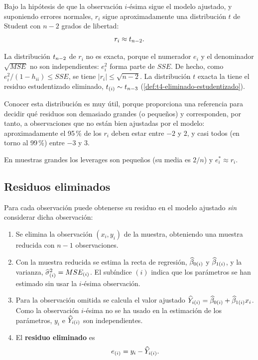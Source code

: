 Bajo la hipótesis de que la observación $i$-ésima sigue el modelo ajustado, y suponiendo errores
normales, $r_i$ sigue aproximadamente una distribución $t$ de Student con $n-2$ grados de
libertad:
\[
  r_i \approx t_{n-2}.
\]

\begin{nota}
  La distribución $t_{n-2}$ de $r_i$ no es exacta, porque el numerador $e_i$ y el
  denominador $\sqrt{MSE}$ no son independientes: $e_i^2$ forma parte de $SSE$. De hecho, como
  $e_i^2/(1-h_{ii})\le SSE$, se tiene $|r_i|\le\sqrt{n-2}$. La distribución $t$ exacta la tiene el
  residuo estudentizado eliminado, $t_{(i)}\sim t_{n-3}$ (\cref{def:t4-eliminado-estudentizado}).
\end{nota}

Conocer esta distribución es muy útil, porque proporciona una referencia para decidir qué
residuos son demasiado grandes (o pequeños) y corresponden, por tanto, a observaciones que no
están bien ajustadas por el modelo: aproximadamente el 95\,\% de los $r_i$ deben estar entre
$-2$ y $2$, y casi todos (en torno al 99\,\%) entre $-3$ y $3$.

En muestras grandes los leverages son pequeños (su media es $2/n$) y $e_i^*\approx r_i$.

\subsection{Residuos eliminados}
\label{sec:t4-eliminados}

Para cada observación puede obtenerse su residuo en el modelo ajustado \emph{sin} considerar
dicha observación:
\begin{enumerate}
  \item Se elimina la observación $(x_i,y_i)$ de la muestra, obteniendo una muestra reducida con
    $n-1$ observaciones.
  \item Con la muestra reducida se estima la recta de regresión, $\widehat{\beta}_{0(i)}$ y
    $\widehat{\beta}_{1(i)}$, y la varianza, $\widehat{\sigma}^2_{(i)}=MSE_{(i)}$. El subíndice $(i)$ indica
    que los parámetros se han estimado sin usar la $i$-ésima observación.
  \item Para la observación omitida se calcula el valor ajustado
    $\widehat{Y}_{i(i)}=\widehat{\beta}_{0(i)}+\widehat{\beta}_{1(i)}x_i$. Como la observación $i$-ésima no se
    ha usado en la estimación de los parámetros, $y_i$ e $\widehat{Y}_{i(i)}$ son independientes.
  \item El \textbf{residuo eliminado} es
    \[
      e_{(i)} = y_i - \widehat{Y}_{i(i)} .
    \]
\end{enumerate}

